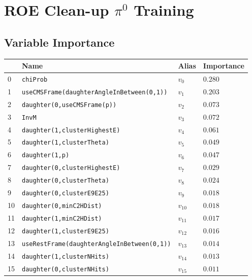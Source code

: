 \section{ROE Clean-up \texorpdfstring{$\pi^0$}{pi0} Training}\label{sec:ROE_pi0}

\subsection{Variable Importance}

\begin{longtable}{| p{} | p{} | p{} |p{} |}
\hline
& Name & Alias & Importance \\ \hline
0 &\texttt{\footnotesize chiProb} & $v_{0}$ & $0.280$ \\ \hline
1 &\texttt{\footnotesize useCMSFrame(daughterAngleInBetween(0,1))} & $v_{1}$ & $0.203$ \\ \hline
2 &\texttt{\footnotesize daughter(0,useCMSFrame(p))} & $v_{2}$ & $0.073$ \\ \hline
3 &\texttt{\footnotesize InvM} & $v_{3}$ & $0.072$ \\ \hline
4 &\texttt{\footnotesize daughter(1,clusterHighestE)} & $v_{4}$ & $0.061$ \\ \hline
5 &\texttt{\footnotesize daughter(1,clusterTheta)} & $v_{5}$ & $0.049$ \\ \hline
6 &\texttt{\footnotesize daughter(1,p)} & $v_{6}$ & $0.047$ \\ \hline
7 &\texttt{\footnotesize daughter(0,clusterHighestE)} & $v_{7}$ & $0.029$ \\ \hline
8 &\texttt{\footnotesize daughter(0,clusterTheta)} & $v_{8}$ & $0.024$ \\ \hline
9 &\texttt{\footnotesize daughter(0,clusterE9E25)} & $v_{9}$ & $0.018$ \\ \hline
10 &\texttt{\footnotesize daughter(0,minC2HDist)} & $v_{10}$ & $0.018$ \\ \hline
11 &\texttt{\footnotesize daughter(1,minC2HDist)} & $v_{11}$ & $0.017$ \\ \hline
12 &\texttt{\footnotesize daughter(1,clusterE9E25)} & $v_{12}$ & $0.016$ \\ \hline
13 &\texttt{\footnotesize useRestFrame(daughterAngleInBetween(0,1))} & $v_{13}$ & $0.014$ \\ \hline
14 &\texttt{\footnotesize daughter(1,clusterNHits)} & $v_{14}$ & $0.013$ \\ \hline
15 &\texttt{\footnotesize daughter(0,clusterNHits)} & $v_{15}$ & $0.011$ \\ \hline

\end{longtable}
